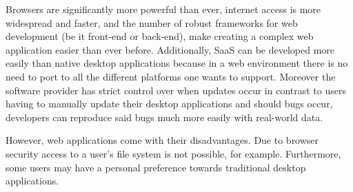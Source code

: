 Browsers are significantly more powerful than ever, internet access is more widespread and faster, and the number
of robust frameworks for web development (be it front-end or back-end), make creating a complex web application easier
than ever before.\cite{akamai2017, statista2021}
Additionally, SaaS can be developed more easily than native desktop applications because in a web environment there is no
need to port to all the different platforms one wants to support. 
Moreover the software provider has strict control over when updates occur in contrast to users having to manually update their 
desktop applications and should bugs occur, developers can reproduce said bugs much more easily with real-world data.\cite{jacobs2005}\par
However, web applications come with their disadvantages. Due to browser security access to a user's file system is not possible, for example.
Furthermore, some users may have a personal preference towards traditional desktop applications. 